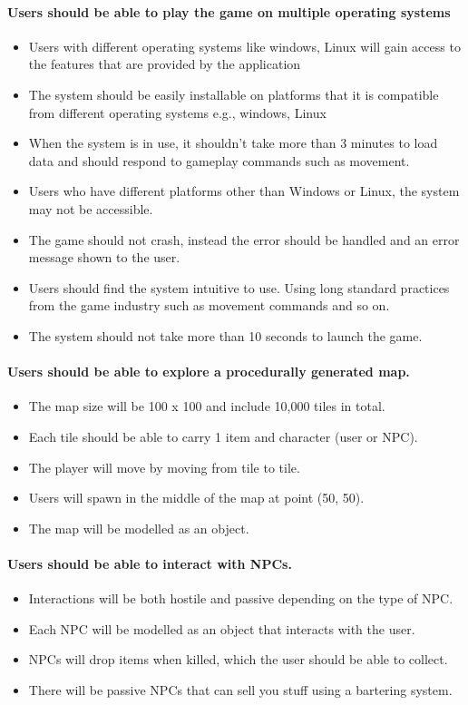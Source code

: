\documentclass{article}
\begin{document}
\paragraph{Users should be able to play the game on multiple operating systems}
\begin{itemize}
	\item Users with different operating systems like windows, Linux will gain access to the features that are provided by the application
	\item The system should be easily installable on platforms that it is compatible from different operating systems e.g., windows, Linux
	\item When the system is in use, it shouldn’t take more than 3 minutes to load data and should respond to gameplay commands such as movement.
	\item Users who have different platforms other than Windows or Linux, the system may not be accessible.
	\item The game should not crash, instead the error should be handled and an error message shown to the user.
	\item Users should find the system intuitive to use. Using long standard practices from the game industry such as movement commands and so on.
	\item The system should not take more than 10 seconds to launch the game.
\end{itemize}

\paragraph{Users should be able to explore a procedurally generated map.}
\begin{itemize}
	\item The map size will be 100 x 100 and include 10,000 tiles in total.
	\item Each tile should be able to carry 1 item and character (user or NPC).
	\item The player will move by moving from tile to tile.
	\item Users will spawn in the middle of the map at point (50, 50).
	\item The map will be modelled as an object.
\end{itemize}

\paragraph{Users should be able to interact with NPCs.}
\begin{itemize}
	\item Interactions will be both hostile and passive depending on the type of NPC.
	\item Each NPC will be modelled as an object that interacts with the user.
	\item NPCs will drop items when killed, which the user should be able to collect.
	\item There will be passive NPCs that can sell you stuff using a bartering system.
\end{itemize}
\end{document}
